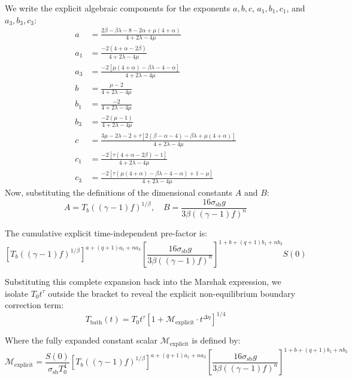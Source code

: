\documentclass[11pt]{article}
\begin{document}
We write the explicit algebraic components for the exponents $a, b, c$, $a_1, b_1, c_1$, and $a_3, b_3, c_3$:
\begin{align}
    a &= \frac{2\beta - \beta\lambda - 8 - 2\alpha + \mu(4+\alpha)}{4 + 2\lambda - 4\mu} \\
    a_1 &= \frac{-2(4+\alpha-2\beta)}{4 + 2\lambda - 4\mu} \\
    a_3 &= \frac{-2\left[\mu(4+\alpha) - \beta\lambda - 4 - \alpha\right]}{4 + 2\lambda - 4\mu} \\[1ex]
    b &= \frac{\mu - 2}{4 + 2\lambda - 4\mu} \\
    b_1 &= \frac{-2}{4 + 2\lambda - 4\mu} \\
    b_3 &= \frac{-2(\mu-1)}{4 + 2\lambda - 4\mu} \\[1ex]
    c &= \frac{3\mu - 2\lambda - 2 + \tau\left[2(\beta-\alpha-4) - \beta\lambda + \mu(4+\alpha)\right]}{4 + 2\lambda - 4\mu} \\
    c_1 &= \frac{-2\left[\tau(4+\alpha-2\beta) - 1\right]}{4 + 2\lambda - 4\mu} \\
    c_3 &= \frac{-2\left[\tau\left(\mu(4+\alpha) - \beta\lambda - 4 - \alpha\right) + 1 - \mu\right]}{4 + 2\lambda - 4\mu}
\end{align}
Now, substituting the definitions of the dimensional constants $A$ and $B$:
\begin{equation}
    A = T_b ((\gamma - 1) f)^{1/\beta}, \quad B = \frac{16 \sigma_{\text{sb}} g}{3\beta ((\gamma - 1) f)^n}
\end{equation}

The cumulative explicit time-independent pre-factor is:
\begin{equation}
    \left[ T_b ((\gamma - 1) f)^{1/\beta} \right]^{a + (q+1)a_1 + n a_3} \left[ \frac{16 \sigma_{\text{sb}} g}{3\beta ((\gamma - 1) f)^n} \right]^{1 + b + (q+1)b_1 + n b_3} S(0)
\end{equation}

Substituting this complete expansion back into the Marshak expression, we isolate $T_0 t^\tau$ outside the bracket to reveal the explicit non-equilibrium boundary correction term:
\begin{equation}
    T_{\text{bath}}(t) = T_0 t^\tau \left[ 1 + \mathcal{M}_{\text{explicit}} \cdot t^{\Delta \eta} \right]^{1/4}
\end{equation}

Where the fully expanded constant scalar $\mathcal{M}_{\text{explicit}}$ is defined by:
\begin{equation}
    \mathcal{M}_{\text{explicit}} = \frac{S(0)}{\sigma_{\text{sb}} T_0^4} \left[ T_b ((\gamma - 1) f)^{1/\beta} \right]^{a + (q+1)a_1 + n a_3} \left[ \frac{16 \sigma_{\text{sb}} g}{3\beta ((\gamma - 1) f)^n} \right]^{1 + b + (q+1)b_1 + n b_3}
\end{equation}
\end{document}
